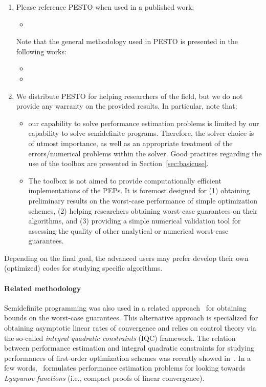 \documentclass[11pt,a4paper]{article}
\newcommand{\pesto}{{PESTO }}
\begin{document}
\begin{enumerate}
\item Please reference \pesto when used in a published work:
\begin{itemize}
	\item {}
\end{itemize}
Note that the general methodology used in \pesto is presented in the following works:
\begin{itemize}
\item {}
\item {}
\end{itemize}
\item We distribute \pesto  for helping researchers of the field, but we do not provide any warranty on the provided results. In particular, note that:
\begin{itemize}
\item our capability to solve performance estimation problems is limited by our capability to solve semidefinite programs. Therefore, the solver choice is of utmost importance, as well as an appropriate treatment of the errors/numerical problems within the solver. Good practices regarding the use of the toolbox are presented in Section~\ref{sec:basicuse}.
\item The toolbox is not aimed to provide computationally efficient implementations of the PEPs. It is foremost designed for (1) obtaining preliminary results on the worst-case performance of simple optimization schemes, (2) helping researchers obtaining worst-case guarantees on their algorithms, and (3) providing a simple numerical validation tool for assessing the quality of other analytical or numerical worst-case guarantees. 
\end{itemize}
\end{enumerate}

Depending on the final goal, the advanced users may prefer develop their own (optimized) codes for studying specific algorithms.
\paragraph{Related methodology} Semidefinite programming was also used in a related approach~\cite{lessard2014analysis} for obtaining bounds on the worst-case guarantees. This alternative approach is specialized for obtaining asymptotic linear rates of convergence and relies on control theory via the so-called \emph{integral quadratic constraints} (IQC) framework. The relation between performance estimation and integral quadratic constraints for studying performances of first-order optimization schemes was recently showed in~\cite{taylor2018lyapunov}. In a few words,~\cite{taylor2018lyapunov} formulates performance estimation problems for looking towards \emph{Lyapunov functions} (i.e., compact proofs of linear convergence).
\end{document}
